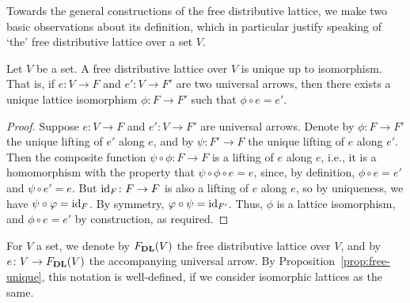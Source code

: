 Towards the general constructions of the free distributive lattice, we make two basic observations about its definition, which in particular justify speaking of `the' free distributive lattice over a set $V$.
  \begin{proposition}\label{prop:free-unique}
    Let $V$ be a set. A free distributive lattice over $V$ is unique up to isomorphism. 
    That is, if $e \colon V \to F$ and $e' \colon V \to F'$ are two universal arrows, then there exists a unique lattice isomorphism $\phi \colon F \to F'$ such that $\phi \circ e = e'$.
  \end{proposition}
  \begin{proof}
  Suppose $e \colon V \to F$ and $e' \colon V \to F'$ are universal arrows. Denote by $\phi \colon F \to F'$ the unique lifting of $e'$ along $e$, and by $\psi \colon F' \to F$ the unique lifting of $e$ along $e'$. Then the composite function $\psi \circ \phi \colon F \to F$ is a lifting of $e$ along $e$, i.e., it is a homomorphism with the property that $\psi \circ \phi \circ e = e$, since, by definition, $\phi \circ e = e'$ and $\psi \circ e' = e$. But $\mathrm{id}_F \colon F \to F$ is also a lifting of $e$ along $e$, so by uniqueness, we have $\psi \circ \varphi = \mathrm{id}_F$. By symmetry, $\varphi \circ \psi = \mathrm{id}_{F'}$. Thus, $\phi$ is a lattice isomorphism, and $\phi \circ e = e'$ by construction, as required.
  \end{proof}
  
  \begin{notation}
  For $V$ a set, we denote by $F_{\mathbf{DL}}(V)$ the free distributive lattice over $V$, and by $e \colon V \to F_{\mathbf{DL}}(V)$ the accompanying universal arrow. By Proposition~\ref{prop:free-unique}, this notation is well-defined, if we consider isomorphic lattices as the same. %
  \end{notation}
  
